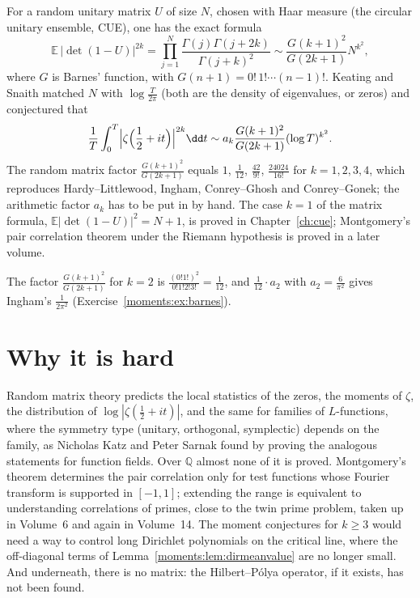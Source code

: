 \begin{remark}\label{moments:rem:keatingsnaith}
For a random unitary matrix $U$ of size $N$, chosen with Haar measure (the circular unitary ensemble, CUE), one has the exact formula
\[
\mathbb E\,|\det(1-U)|^{2k}=\prod_{j=1}^N\frac{\Gamma(j)\Gamma(j+2k)}{\Gamma(j+k)^2}\sim\frac{G(k+1)^2}{G(2k+1)}N^{k^2},
\]
where $G$ is Barnes' function, with $G(n+1)=0!\,1!\cdots(n-1)!$. Keating and Snaith matched $N$ with $\log\frac T{2\pi}$ (both are the density of
eigenvalues, or zeros) and conjectured that
\[
\frac1T\int_0^T\Bigl|\zeta\Bigl(\frac12+it\Bigr)\Bigr|^{2k}\dd t\sim a_k\frac{G(k+1)^2}{G(2k+1)}(\log T)^{k^2}.
\]
The random matrix factor $\frac{G(k+1)^2}{G(2k+1)}$ equals $1$, $\frac1{12}$, $\frac{42}{9!}$, $\frac{24024}{16!}$ for $k=1,2,3,4$, which reproduces Hardy--Littlewood,
Ingham, Conrey--Ghosh and Conrey--Gonek; the arithmetic factor $a_k$ has to be put in by hand. The case $k=1$ of the matrix formula, $\mathbb E|\det(1-U)|^2=N+1$,
is proved in Chapter~\ref{ch:cue}; Montgomery's pair correlation theorem under the Riemann hypothesis is proved in a later volume.
\end{remark}

The factor $\frac{G(k+1)^2}{G(2k+1)}$ for $k=2$ is $\frac{(0!1!)^2}{0!1!2!3!}=\frac1{12}$, and $\frac1{12}\cdot a_2$ with $a_2=\frac6{\pi^2}$ gives Ingham's
$\frac1{2\pi^2}$ (Exercise~\ref{moments:ex:barnes}).

\section{Why it is hard}

Random matrix theory predicts the local statistics of the zeros, the moments of $\zeta$, the distribution of $\log|\zeta(\frac12+it)|$, and the same
for families of $L$-functions, where the symmetry type (unitary, orthogonal, symplectic) depends on the family, as Nicholas Katz and Peter Sarnak found by
proving the analogous statements for function fields. Over $\mathbb Q$ almost none of it is proved. Montgomery's theorem determines the pair correlation only
for test functions whose Fourier transform is supported in $[-1,1]$; extending the range is equivalent to understanding correlations of primes, close to
the twin prime problem, taken up in Volume~6 and again in Volume~14. The moment conjectures for $k\ge3$ would need a way to control long Dirichlet polynomials on the
critical line, where the off-diagonal terms of Lemma~\ref{moments:lem:dirmeanvalue} are no longer small. And underneath, there is no matrix: the
Hilbert--P\'olya operator, if it exists, has not been found.

